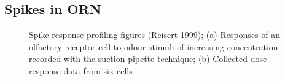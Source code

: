 \documentclass[
]{article}
\begin{document}
\clearpage

\hypertarget{spikes-in-orn}{%
\subsection*{Spikes in ORN}\label{spikes-in-orn}}

\begin{figure}

{\centering {}

}

\caption{Spike-response profiling figures (Reisert 1999); (a) Responses of an olfactory receptor cell to odour stimuli of increasing concentration recorded with the suction pipette technique; (b) Collected dose-response data from six cells}\label{fig:r99f13}
\end{figure}
\end{document}

